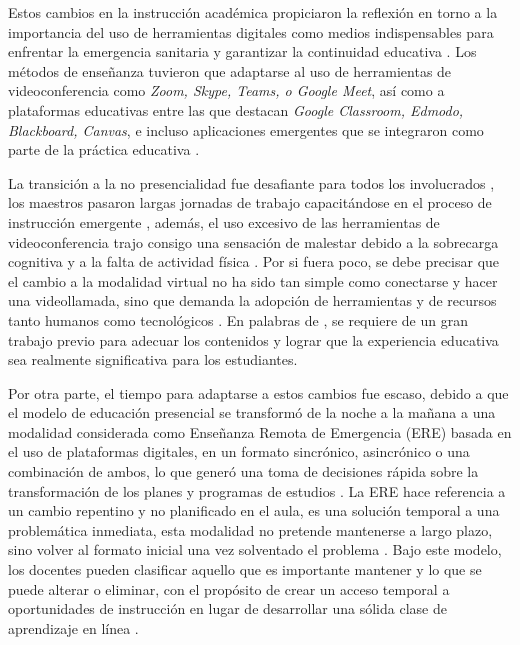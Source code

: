 \documentclass[spanish]{textolivre}
\begin{document}
Estos cambios en la instrucción académica propiciaron la reflexión en torno a la importancia del uso de herramientas digitales como medios indispensables para enfrentar la emergencia sanitaria y garantizar la continuidad educativa \cite{valle_martinez_experiencia_2020}. Los métodos de enseñanza tuvieron que adaptarse al uso de herramientas de videoconferencia como \textit{Zoom, Skype, Teams, o Google Meet}, así como a plataformas educativas entre las que destacan \textit{Google Classroom, Edmodo, Blackboard, Canvas}, e incluso aplicaciones emergentes que se integraron como parte de la práctica educativa \cite{delgado_sanchez_entornos_2020}.

La transición a la no presencialidad fue desafiante para todos los involucrados \cite{abou-khalil_emergency_2020}, los maestros pasaron largas jornadas de trabajo capacitándose en el proceso de instrucción emergente \cite{ault_providing_2020}, además, el uso excesivo de las herramientas de videoconferencia trajo consigo una sensación de malestar debido a la sobrecarga cognitiva y a la falta de actividad física \cite{bailenson_nonverbal_2021}. Por si fuera poco, se debe precisar que el cambio a la modalidad virtual no ha sido tan simple como conectarse y hacer una videollamada, sino que demanda la adopción de herramientas y de recursos tanto humanos como tecnológicos \cite{tunon_navarro_confinamiento_2020}. En palabras de \textcite{berruecos_vila_covid-19:_2020}, se requiere de un gran trabajo previo para adecuar los contenidos y lograr que la experiencia educativa sea realmente significativa para los estudiantes.

Por otra parte, el tiempo para adaptarse a estos cambios fue escaso, debido a que el modelo de educación presencial se transformó de la noche a la mañana a una modalidad considerada como Enseñanza Remota de Emergencia (ERE) basada en el uso de plataformas digitales, en un formato sincrónico, asincrónico o una combinación de ambos, lo que generó una toma de decisiones rápida sobre la transformación de los planes y programas de estudios \cite{donitsa-schmidt_opportunities_2020}. La ERE hace referencia a un cambio repentino y no planificado en el aula, es una solución temporal a una problemática inmediata, esta modalidad no pretende mantenerse a largo plazo, sino volver al formato inicial una vez solventado el problema \cite{hodges_difference_2020}. Bajo este modelo, los docentes pueden clasificar aquello que es importante mantener y lo que se puede alterar o eliminar, con el propósito de crear un acceso temporal a oportunidades de instrucción en lugar de desarrollar una sólida clase de aprendizaje en línea \cite{okeefe_delivering_2020}.
\end{document}
